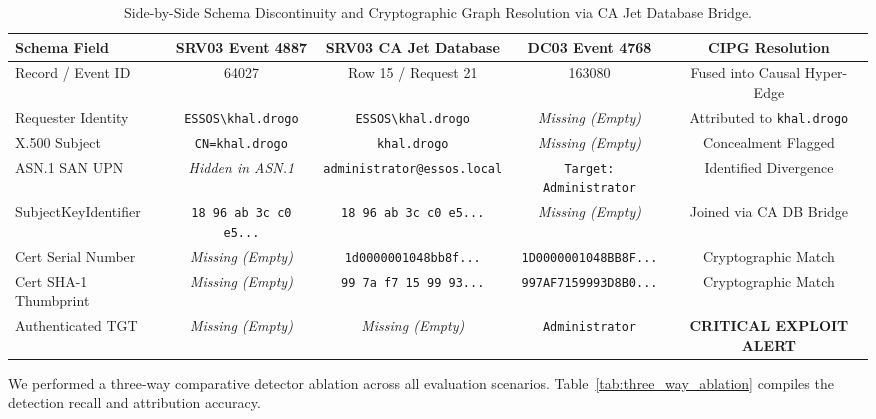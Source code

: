 \begin{table}[htbp]
\centering
\small
\caption{Side-by-Side Schema Discontinuity and Cryptographic Graph Resolution via CA Jet Database Bridge.}
\label{tab:schema_discontinuity_proof}
\begin{tabularx}{\textwidth}{lcccc}
\toprule
\textbf{Schema Field} & \textbf{SRV03 Event 4887} & \textbf{SRV03 CA Jet Database} & \textbf{DC03 Event 4768} & \textbf{CIPG Resolution} \\
\midrule
Record / Event ID & 64027 & Row 15 / Request 21 & 163080 & Fused into Causal Hyper-Edge \\
Requester Identity & \texttt{ESSOS\textbackslash khal.drogo} & \texttt{ESSOS\textbackslash khal.drogo} & \textit{Missing (Empty)} & Attributed to \texttt{khal.drogo} \\
X.500 Subject & \texttt{CN=khal.drogo} & \texttt{khal.drogo} & \textit{Missing (Empty)} & Concealment Flagged \\
ASN.1 SAN UPN & \textit{Hidden in ASN.1} & \texttt{administrator@essos.local} & \texttt{Target: Administrator} & Identified Divergence \\
SubjectKeyIdentifier & \texttt{18 96 ab 3c c0 e5...} & \texttt{18 96 ab 3c c0 e5...} & \textit{Missing (Empty)} & Joined via CA DB Bridge \\
Cert Serial Number & \textit{Missing (Empty)} & \texttt{1d0000001048bb8f...} & \texttt{1D0000001048BB8F...} & Cryptographic Match \\
Cert SHA-1 Thumbprint & \textit{Missing (Empty)} & \texttt{99 7a f7 15 99 93...} & \texttt{997AF7159993D8B0...} & Cryptographic Match \\
Authenticated TGT & \textit{Missing (Empty)} & \textit{Missing (Empty)} & \texttt{Administrator} & \textbf{CRITICAL EXPLOIT ALERT} \\
\bottomrule
\end{tabularx}
\end{table}

We performed a three-way comparative detector ablation across all evaluation scenarios. Table~\ref{tab:three_way_ablation} compiles the detection recall and attribution accuracy.

